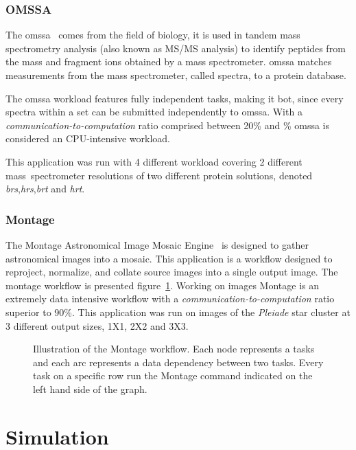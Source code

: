 \subsubsection{OMSSA}

The \ac{omssa}~\cite{Geer2004}  comes from the  field of  biology, it is  used in
tandem mass  spectrometry analysis  (also known as  MS/MS analysis)  to identify
peptides   from   the   mass   and    fragment   ions   obtained   by   a   mass
spectrometer. \ac{omssa} matches measurements from the mass spectrometer, called
spectra, to a protein database.

The \ac{omssa}  workload features fully  independent tasks, making  it \ac{bot},
since every spectra  within a set can be submitted  independently to \ac{omssa}.
With a  \emph{communication-to-computation} ratio comprised between  20\% and \%
\ac{omssa} is considered an CPU-intensive workload.

This application was run with 4 different workload covering 2 different
mass~spectrometer resolutions of two different protein solutions, denoted
\emph{brs},\emph{hrs},\emph{brt} and \emph{hrt}.

\subsubsection{Montage}

The Montage  Astronomical Image Mosaic Engine~\cite{montage2009}  is designed to
gather  astronomical images  into  a  mosaic.  This  application  is a  workflow
designed to reproject, normalize, and collate source images into a single output
image. The montage workflow  is presented figure~\ref{fig:montagewf}. Working on
images   Montage   is   an   extremely    data   intensive   workflow   with   a
\emph{communication-to-computation} ratio superior to 90\%. This application was
run on  images of the \emph{Pleiade}  star cluster at 3  different output sizes,
1X1, 2X2 and 3X3.

\begin{figure}[ht]
	
	\caption{Illustration of the Montage workflow. Each node represents a
	tasks and each arc represents a data dependency between two tasks. Every
	task on a specific row run the Montage command indicated on the left
	hand side of the graph.}
	\label{fig:montagewf}
\end{figure}

\section{Simulation}
\label{sc:simulation}

